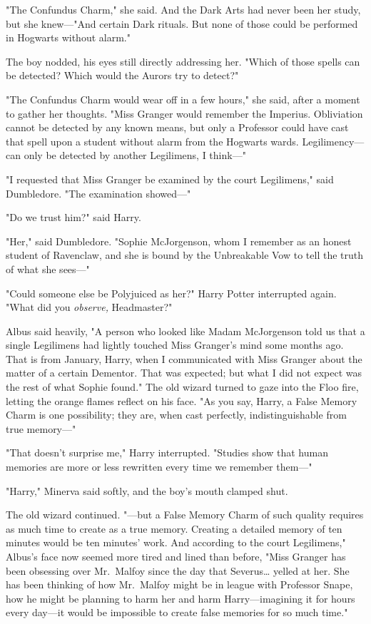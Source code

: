"The Confundus Charm," she said. And the Dark Arts had never been her study,
but she knew---"And certain Dark rituals. But none of those could be performed
in Hogwarts without alarm."

The boy nodded, his eyes still directly addressing her. "Which of those spells
can be detected? Which would the Aurors try to detect?"

"The Confundus Charm would wear off in a few hours," she said, after a moment
to gather her thoughts. "Miss Granger would remember the Imperius. Obliviation
cannot be detected by any known means, but only a Professor could have cast
that spell upon a student without alarm from the Hogwarts wards.
Legilimency---can only be detected by another Legilimens, I think---"

"I requested that Miss Granger be examined by the court Legilimens," said
Dumbledore. "The examination showed---"

"Do we trust him?" said Harry.

"Her," said Dumbledore. "Sophie McJorgenson, whom I remember as an honest
student of Ravenclaw, and she is bound by the Unbreakable Vow to tell the truth
of what she sees---"

"Could someone else be Polyjuiced as her?" Harry Potter interrupted again.
"What did you \emph{observe,} Headmaster?"

Albus said heavily, "A person who looked like Madam McJorgenson told us that a
single Legilimens had lightly touched Miss Granger's mind some months ago. That
is from January, Harry, when I communicated with Miss Granger about the matter
of a certain Dementor. That was expected; but what I did not expect was the
rest of what Sophie found." The old wizard turned to gaze into the Floo fire,
letting the orange flames reflect on his face. "As you say, Harry, a False
Memory Charm is one possibility; they are, when cast perfectly,
indistinguishable from true memory---"

"That doesn't surprise me," Harry interrupted. "Studies show that human
memories are more or less rewritten every time we remember them---"

"Harry," Minerva said softly, and the boy's mouth clamped shut.

The old wizard continued. "---but a False Memory Charm of such quality requires
as much time to create as a true memory. Creating a detailed memory of ten
minutes would be ten minutes' work. And according to the court Legilimens,"
Albus's face now seemed more tired and lined than before, "Miss Granger has
been obsessing over Mr.~Malfoy since the day that Severus{\ldots} yelled at
her. She has been thinking of how Mr.~Malfoy might be in league with Professor
Snape, how he might be planning to harm her and harm Harry---imagining it for
hours every day---it would be impossible to create false memories for so much
time."

